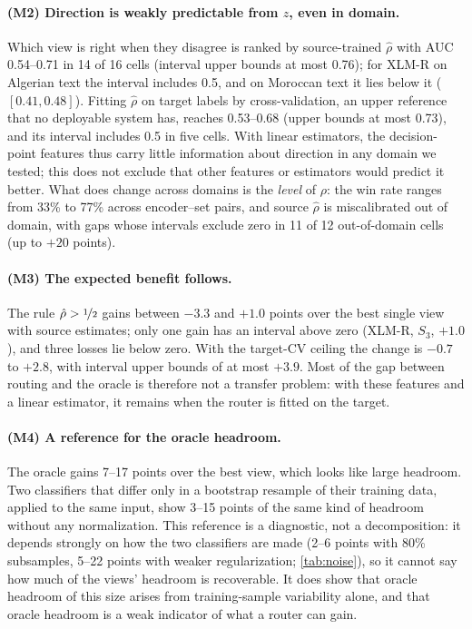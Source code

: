 \paragraph{(M2) Direction is weakly predictable from $z$, even in domain.} Which view is right when they disagree is ranked by source-trained $\hat\rho$ with AUC 0.54--0.71 in 14 of 16 cells (interval upper bounds at most 0.76); for XLM-R on Algerian text the interval includes 0.5, and on Moroccan text it lies below it ($[0.41,0.48]$). Fitting $\hat\rho$ on target labels by cross-validation, an upper reference that no deployable system has, reaches 0.53--0.68 (upper bounds at most 0.73), and its interval includes 0.5 in five cells. With linear estimators, the decision-point features thus carry little information about direction in any domain we tested; this does not exclude that other features or estimators would predict it better. What does change across domains is the \emph{level} of $\rho$: the win rate ranges from 33\% to 77\% across encoder--set pairs, and source $\hat\rho$ is miscalibrated out of domain, with gaps whose intervals exclude zero in 11 of 12 out-of-domain cells (up to $+20$ points).

\paragraph{(M3) The expected benefit follows.} The rule $\hat\rho>\nicefrac12$ gains between $-3.3$ and $+1.0$ points over the best single view with source estimates; only one gain has an interval above zero (XLM-R, $S_3$, $+1.0$), and three losses lie below zero. With the target-CV ceiling the change is $-0.7$ to $+2.8$, with interval upper bounds of at most $+3.9$. Most of the gap between routing and the oracle is therefore not a transfer problem: with these features and a linear estimator, it remains when the router is fitted on the target.

\paragraph{(M4) A reference for the oracle headroom.} The oracle gains 7--17 points over the best view, which looks like large headroom. Two classifiers that differ only in a bootstrap resample of their training data, applied to the same input, show 3--15 points of the same kind of headroom without any normalization. This reference is a diagnostic, not a decomposition: it depends strongly on how the two classifiers are made (2--6 points with 80\% subsamples, 5--22 points with weaker regularization; \cref{tab:noise}), so it cannot say how much of the views' headroom is recoverable. It does show that oracle headroom of this size arises from training-sample variability alone, and that oracle headroom is a weak indicator of what a router can gain.

